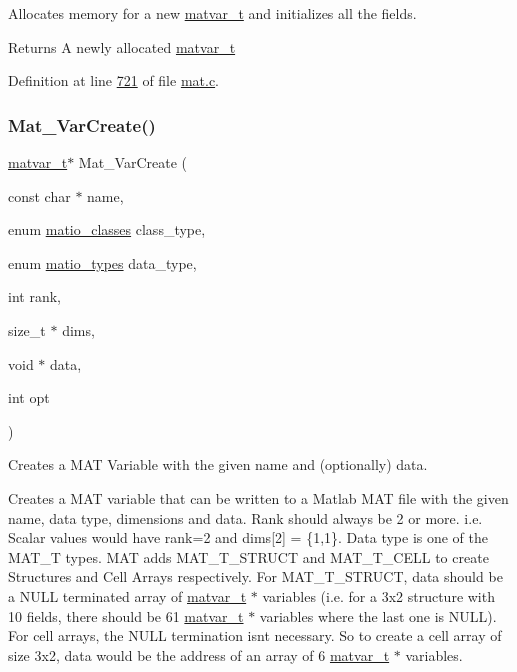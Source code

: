 Allocates memory for a new \hyperlink{group___m_a_t_structmatvar__t}{matvar\+\_\+t} and initializes all the fields. 

\begin{DoxyReturn}{Returns}
A newly allocated \hyperlink{group___m_a_t_structmatvar__t}{matvar\+\_\+t} 
\end{DoxyReturn}


Definition at line \hyperlink{mat_8c_source_l00721}{721} of file \hyperlink{mat_8c_source}{mat.\+c}.

\mbox{\label{group___m_a_t_ga1c54a84bb4d810c6fccdb8869489eac4}} 
\subsubsection{\texorpdfstring{Mat\+\_\+\+Var\+Create()}{Mat\_VarCreate()}}
{\footnotesize\ttfamily \hyperlink{group___m_a_t_structmatvar__t}{matvar\+\_\+t}$\ast$ Mat\+\_\+\+Var\+Create (\begin{DoxyParamCaption}\item[{const char $\ast$}]{name,  }\item[{enum \hyperlink{group___m_a_t_gad4d60ae7b709fc81bfd744fb4c857c40}{matio\+\_\+classes}}]{class\+\_\+type,  }\item[{enum \hyperlink{group___m_a_t_gacf7b3b879282b7ab3a51190e49bf3453}{matio\+\_\+types}}]{data\+\_\+type,  }\item[{int}]{rank,  }\item[{size\+\_\+t $\ast$}]{dims,  }\item[{void $\ast$}]{data,  }\item[{int}]{opt }\end{DoxyParamCaption})}



Creates a M\+AT Variable with the given name and (optionally) data. 

Creates a M\+AT variable that can be written to a Matlab M\+AT file with the given name, data type, dimensions and data. Rank should always be 2 or more. i.\+e. Scalar values would have rank=2 and dims\mbox{[}2\mbox{]} = \{1,1\}. Data type is one of the M\+A\+T\+\_\+T types. M\+AT adds M\+A\+T\+\_\+\+T\+\_\+\+S\+T\+R\+U\+CT and M\+A\+T\+\_\+\+T\+\_\+\+C\+E\+LL to create Structures and Cell Arrays respectively. For M\+A\+T\+\_\+\+T\+\_\+\+S\+T\+R\+U\+CT, data should be a N\+U\+LL terminated array of \hyperlink{group___m_a_t_structmatvar__t}{matvar\+\_\+t} $\ast$ variables (i.\+e. for a 3x2 structure with 10 fields, there should be 61 \hyperlink{group___m_a_t_structmatvar__t}{matvar\+\_\+t} $\ast$ variables where the last one is N\+U\+LL). For cell arrays, the N\+U\+LL termination isn\textquotesingle{}t necessary. So to create a cell array of size 3x2, data would be the address of an array of 6 \hyperlink{group___m_a_t_structmatvar__t}{matvar\+\_\+t} $\ast$ variables.

